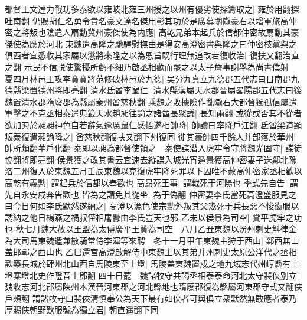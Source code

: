 都督王文達力戰功多泰欲以雍岐北雍三州授之以州有優劣使探籌取之|{
	雍於用翻探吐南翻}
仍賜胡仁名勇令貴名豪文達名傑用彰其功於是廣募關隴豪右以增軍旅高仲密之將叛也隂遣人扇動冀州豪傑使為内應|{
	高乾兄弟本起兵於信都仲密故扇動其豪傑使為應於河北}
東魏遣高隆之馳驛慰撫由是得安高澄密書與隆之曰仲密枝黨與之俱西者宜悉收其家屬以懲將來隆之以為恩旨既行理無追改若復收治|{
	復扶又翻治直之翻}
示民不信脱使驚擾所虧不細乃啟丞相歡而罷之以太子詹事謝舉為尚書僕射　夏四月林邑王攻李賁賁將范修破林邑於九德|{
	吴分九真立九德郡五代志曰日南郡九德縣梁置德州將即亮翻}
清水氐酋李鼠仁|{
	清水縣漢屬天水郡晉屬畧陽郡五代志曰後魏置清水郡隋廢郡為縣屬秦州酋慈秋翻}
乘魏之敗據險作亂隴右大都督獨孤信屢遣軍擊之不克丞相泰遣典籖天水趙昶往諭之諸酋長聚議|{
	長知兩翻}
或從或否其不從者欲加刃於昶昶神色自若辭氣逾厲鼠仁感悟遂相帥降|{
	帥讀曰率降戶江翻}
氐酋梁道顯叛泰復遣昶諭降之|{
	酋慈秋翻復扶又翻下州復同}
徙其豪帥四千餘人并部落於華州|{
	帥所類翻華戶化翻}
泰即以昶為都督使領之　泰使諜潜入虎牢令守將魏光固守|{
	諜徒協翻將即亮翻}
侯景獲之改其書云宜速去縱諜入城光宵遁景獲高仲密妻子送鄴北豫洛二州復入於東魏五月壬辰東魏以克復虎牢降死罪以下囚唯不赦高仲密家丞相歡以高乾有義勲|{
	謂起兵於信都以奉歡也}
高昂死王事|{
	謂戰死于河陽也}
季式先自告|{
	謂先自永安戍奔告歡也}
皆為之請免其從坐|{
	為于偽翻}
仲密妻李氏當死高澄盛服見之曰今日何如李氏默然遂納之|{
	高澄以漁色使宗勲外叛其父幾死于兵長惡不悛衒服以誘納之他日楊燕之禍叔侄相屠釁由李氏豈天也邪}
乙未以侯景為司空|{
	賞平虎牢之功也}
秋七月魏大赦以王盟為太傅廣平王贊為司空　八月乙丑東魏以汾州刺史斛律金為大司馬東魏遣兼散騎常侍李渾等來聘　冬十一月甲午東魏主狩于西山|{
	鄴西無山盖邯鄲之西山也}
乙巳還宫高澄啟解侍中東魏主以其弟并州刺史太原公洋代之丞相歡築長城於肆州北山西自馬陵東至土墱|{
	馬陵盖東魏置戍之地九域志代州崞縣有土墱寨墱北史作隥音士鄧翻}
四十日罷　魏諸牧守共謁丞相泰泰命河北太守裴侠别立|{
	魏收志河北郡屬陕州本漢晉河東郡之河北縣地也隋廢郡復為縣屬河東郡守式又翻侠戶頰翻}
謂諸牧守曰裴俠清慎奉公為天下最有如侠者可與俱立衆默然無敢應者泰乃厚賜侠朝野歎服號為獨立君|{
	朝直遥翻下同}



